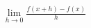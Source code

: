 \documentclass[preview]{standalone}
\begin{document}
\begin{align*}
\lim_{h \to 0} \frac{f(x+h)-f(x)}{h}
\end{align*}
\end{document}

